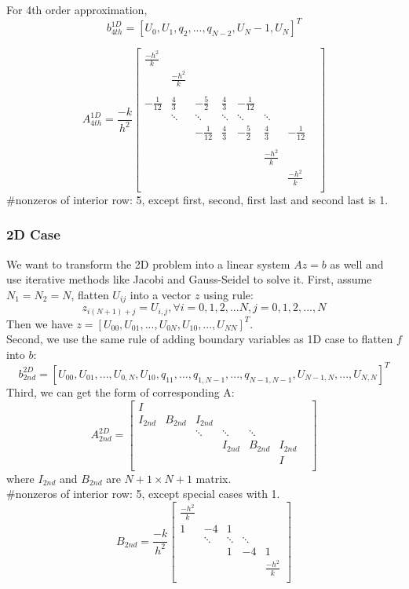 \documentclass[a4paper]{article}
\begin{document}
For 4th order approximation, 
$$b_{4th}^{1D} = [ U_0, U_1, q_2,...,q_{N-2}, U_N-1,U_N ]^T$$

\[
A_{4th}^{1D}
= \frac{-k}{h^2}
\begin{bmatrix}
    
    \frac{-h^2}{k}   &  &   & & & &\\
       & \frac{-h^2}{k} &   &   &  & &\\\\
     -\frac{1}{12}  & \frac{4}{3}  & -\frac{5}{2} & \frac{4}{3}  & - \frac{1}{12} & &&\\
     & \ddots& \ddots & \ddots & \ddots & \ddots & \\
    && -\frac{1}{12}  & \frac{4}{3}  & -\frac{5}{2} & \frac{4}{3}  & - \frac{1}{12} \\\\
     & & & &  &  \frac{-h^2}{k}  & \\
     & & & &  & &\frac{-h^2}{k}  \\
\end{bmatrix}
\]
\#nonzeros of interior row: 5, except first, second, first last and second last is 1.

\subsubsection{2D Case}
We want to transform the 2D problem into a linear system $Az=b$ as well and use iterative methods like Jacobi and Gauss-Seidel to solve it.
First, assume $N_1=N_2=N$, flatten $U_{ij}$ into a vector $z$ using rule: 
$$z_{i(N+1)+j} = U_{i,j}, \forall i = 0,1,2,...N, j = 0,1,2,...,N$$
Then we have $z = [U_{00}, U_{01},...,U_{0N},U_{10},...,U_{NN}]^T$.  \\
Second, we use the same rule of adding boundary variables as 1D case to flatten $f$ into $b$:
$$b_{2nd}^{2D} = [U_{00}, U_{01},..., U_{0,N}, U_{10}, q_{11},...,q_{1,N-1},...,q_{N-1,N-1},U_{N-1,N},...,U_{N,N} ]^T $$
Third, we can get the form of corresponding A:
\[
A_{2nd}^{2D}
= 
\begin{bmatrix}
     I &  &   &   &  &\\
    I_{2nd} & B_{2nd} & I_{2nd}  &   &  &\\
     & & \ddots & \ddots & \ddots & & \\
     & & & I_{2nd}& B_{2nd}  & I_{2nd}& \\
     & & &  &  &  I  \\
\end{bmatrix}
\]
where $I_{2nd}$ and $B_{2nd}$ are $N+1 \times N+1$ matrix.\\
\#nonzeros of interior row: 5, except special cases with 1. 
\[
B_{2nd} = \frac{-k}{h^2}
\begin{bmatrix}
    \frac{-h^2}{k}\\
    1 & -4 & 1  &     \\
    
     & \ddots & \ddots & \ddots  \\
     &  & 1 & -4  &1 \\
     &  &   & & \frac{-h^2}{k}\\
\end{bmatrix}
\]
\end{document}
